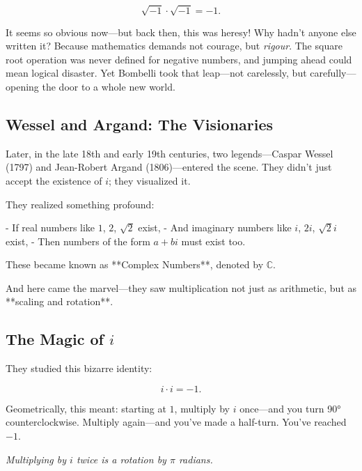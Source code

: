 \[
\sqrt{-1} \cdot \sqrt{-1} = -1.
\]

It seems so obvious now—but back then, this was heresy! Why hadn’t anyone else written it? Because mathematics demands not courage, but \emph{rigour}. The square root operation was never defined for negative numbers, and jumping ahead could mean logical disaster. Yet Bombelli took that leap—not carelessly, but carefully—opening the door to a whole new world.

\subsection*{Wessel and Argand: The Visionaries}

Later, in the late 18th and early 19th centuries, two legends—Caspar Wessel (1797) and Jean-Robert Argand (1806)—entered the scene. They didn’t just accept the existence of $i$; they visualized it.

They realized something profound:

- If real numbers like $1$, $2$, $\sqrt{2}$ exist,
- And imaginary numbers like $i$, $2i$, $\sqrt{2}i$ exist,
- Then numbers of the form $a + bi$ must exist too.

These became known as **Complex Numbers**, denoted by $\mathbb{C}$.

And here came the marvel—they saw multiplication not just as arithmetic, but as **scaling and rotation**.

\subsection*{The Magic of $i$}

They studied this bizarre identity:

\[
i \cdot i = -1.
\]

Geometrically, this meant: starting at $1$, multiply by $i$ once—and you turn 90° counterclockwise. Multiply again—and you've made a half-turn. You’ve reached $-1$.

\begin{center}

\textit{Multiplying by $i$ twice is a rotation by $\pi$ radians.}
\end{center}

